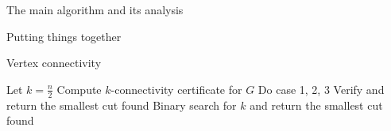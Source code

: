 \documentclass{article}
\begin{document}
\begin{section}{The main algorithm and its analysis}
  \begin{section}{Putting things together}
    \begin{algorithm}
      \caption{Vertex connectivity}
    \begin{algorithmic}
    \State Let $k = \frac{n}{2}$
    \State Compute $k$-connectivity certificate for $G$
    \State Do case 1, 2, 3
    \State Verify and return the smallest cut found
    \State Binary search for $k$ and return the smallest cut found
    \end{algorithmic}
  \end{algorithm}
  \end{section}
  
\end{section}





\end{document}
